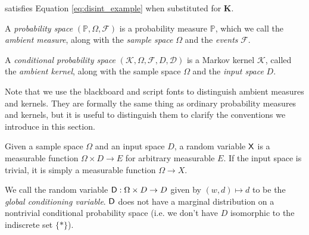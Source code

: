 satisfies Equation \ref{eq:disint_example} when substituted for $\mathbf{K}$.




\begin{definition}
A \emph{probability space} $(\mathbb{P},\Omega,\mathcal{F})$ is a probability measure $\mathbb{P}$, which we call the \emph{ambient measure}, along with the \emph{sample space} $\Omega$ and the \emph{events} $\mathcal{F}$.

A \emph{conditional probability space} $(\mathscr{K},\Omega,\mathcal{F},D,\mathcal{D})$ is a Markov kernel $\mathscr{K}$, called the \emph{ambient kernel}, along with the sample space $\Omega$ and the \emph{input space} $D$.
\end{definition}

Note that we use the blackboard and script fonts to distinguish ambient measures and kernels. They are formally the same thing as ordinary probability measures and kernels, but it is useful to distinguish them to clarify the conventions we introduce in this section.

\begin{definition}
Given a sample space $\Omega$ and an input space $D$, a random variable $\mathsf{X}$ is a measurable function $\Omega\times D\to E$ for arbitrary measurable $E$. If the input space is trivial, it is simply a measurable function $\Omega\to X$.

We call the random variable $\mathsf{D}:\Omega\times D\to D$ given by $(w,d)\mapsto d$ to be the \emph{global conditioning variable}. $\mathsf{D}$ does not have a marginal distribution on a nontrivial conditional probability space (i.e. we don't have $D$ isomorphic to the indiscrete set $\{*\}$).
\end{definition}

